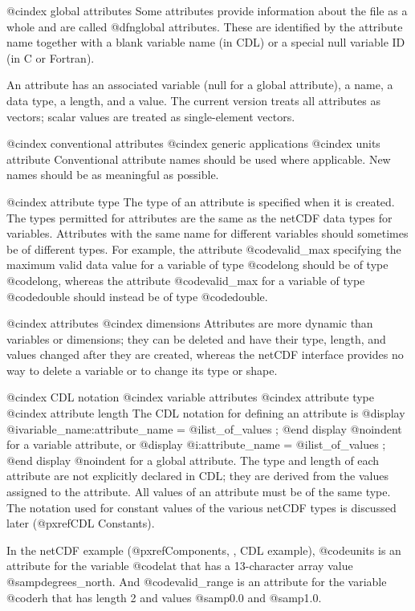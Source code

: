 @cindex global attributes
Some attributes provide information about the file as a whole and are
called @dfn{global} attributes.
These are identified by the attribute name together with a blank
variable name (in CDL) or a special null variable ID (in C or Fortran).

An attribute has an associated variable (null for a global attribute),
a name, a data type, a length, and a value.
The current version treats all attributes as vectors; scalar values
are treated as single-element vectors.

@cindex conventional attributes
@cindex generic applications
@cindex units attribute
Conventional attribute names should be used where applicable.
New names should be as meaningful as possible.

@cindex attribute type
The type of an attribute is specified when it is created.  The types
permitted for attributes are the same as the netCDF data types
for variables.  Attributes with the same name for different
variables should sometimes be of different types.  For example, the
attribute @code{valid_max} specifying the maximum valid data value for a
variable of type @code{long} should be of type @code{long}, whereas the
attribute @code{valid_max} for a variable of type @code{double} should
instead be of type @code{double}.

@cindex attributes
@cindex dimensions
Attributes are more dynamic than variables or dimensions; they
can be deleted and
have their type, length, and values changed after they are created,
whereas the netCDF interface provides no way to delete a variable or to
change its type or shape.

@cindex CDL notation
@cindex variable attributes
@cindex attribute type
@cindex attribute length
The CDL notation for defining an attribute is
@display
    @i{variable_name:attribute_name} = @i{list_of_values} ;
@end display
@noindent
for a variable attribute, or
@display
    @i{:attribute_name} = @i{list_of_values} ;
@end display
@noindent
for a global attribute.  The type and length of each attribute are not
explicitly declared in CDL; they are derived from the values assigned to
the attribute.  All values of an attribute must be of the same type.
The notation used for constant values of the various netCDF types is
discussed later (@pxref{CDL Constants}).

In the netCDF example (@pxref{Components, , CDL example}), @code{units}
is an attribute for the variable @code{lat} that has a
13-character array value @samp{degrees_north}. And @code{valid_range} is an
attribute for the variable @code{rh} that has length 2 and values
@samp{0.0} and @samp{1.0}.

